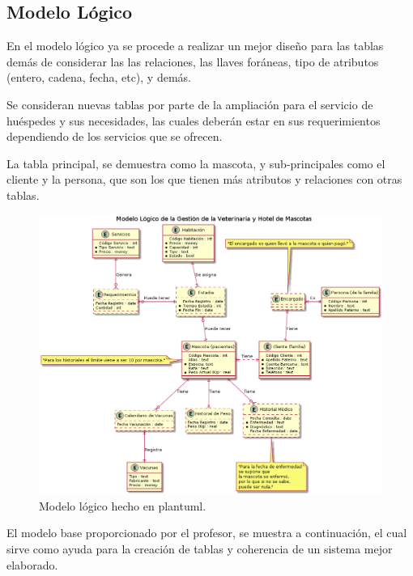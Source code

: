 \documentclass[
  12pt,
  hidelinks,
  a4paper,
  headings=standardclasses,
  headings=big,
  spanish
]{scrartcl}
\begin{document}
\pagebreak
\subsection{Modelo Lógico}
En el modelo lógico ya se procede a realizar un mejor diseño para las tablas demás de considerar las las relaciones, las llaves foráneas, tipo de atributos (entero, cadena, fecha, etc), y demás.

Se consideran nuevas tablas por parte de la ampliación para el servicio de huéspedes y sus necesidades, las cuales deberán estar en sus requerimientos dependiendo de los servicios que se ofrecen.

La tabla principal, se demuestra como la mascota, y sub-principales como el cliente y la persona, que son los que tienen más atributos y relaciones con otras tablas.

\begin{figure}[H]
  \centering
  \includegraphics[width=\textwidth]{veterinaria_modelo_logico.png}
  \caption{Modelo lógico hecho en plantuml.}
\end{figure}

\pagebreak
El modelo base proporcionado por el profesor, se muestra a continuación, el cual sirve como ayuda para la creación de tablas y coherencia de un sistema mejor elaborado.
\end{document}
